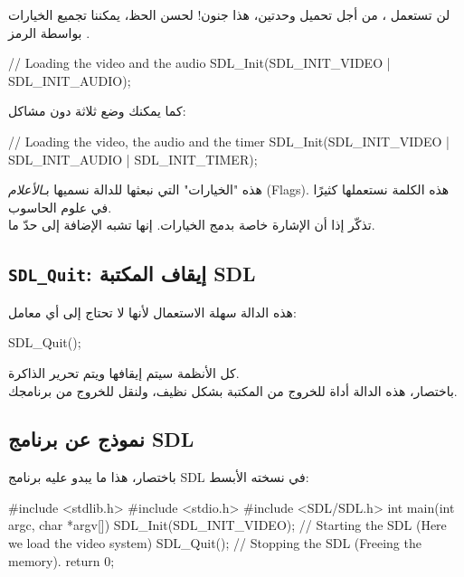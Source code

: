 لن تستعمل
،
من أجل تحميل وحدتين، هذا جنون! لحسن الحظ، يمكننا تجميع الخيارات بواسطة الرمز
\InlineCode{|}.

\begin{Csource}
// Loading the video and the audio
SDL_Init(SDL_INIT_VIDEO | SDL_INIT_AUDIO);
\end{Csource}

كما يمكنك وضع ثلاثة دون مشاكل:

\begin{Csource}
// Loading the video, the audio and the timer
SDL_Init(SDL_INIT_VIDEO | SDL_INIT_AUDIO | SDL_INIT_TIMER);
\end{Csource}

\begin{information}
هذه "الخيارات" التي نبعثها للدالة 
نسميها بـ\textit{الأعلام}
(\textenglish{Flags}).
هذه الكلمة نستعملها كثيرًا في علوم الحاسوب.\\
تذكّر إذا أن الإشارة
\InlineCode{|}
خاصة بدمج الخيارات. إنها تشبه الإضافة إلى حدّ ما.
\end{information}

\subsection{\texttt{SDL\_Quit}: إيقاف المكتبة \textenglish{SDL}}

هذه الدالة سهلة الاستعمال لأنها لا تحتاج إلى أي معامل:

\begin{Csource}
SDL_Quit();
\end{Csource}

كل الأنظمة سيتم إيقافها ويتم تحرير الذاكرة.\\
باختصار، هذه الدالة أداة للخروج من المكتبة بشكل نظيف، ولنقل للخروج من برنامجك.

\subsection{نموذج عن برنامج \textenglish{SDL}}
باختصار، هذا ما يبدو عليه برنامج
\textenglish{SDL}
في نسخته الأبسط:

\begin{Csource}
#include <stdlib.h>
#include <stdio.h>
#include <SDL/SDL.h>
int main(int argc, char *argv[])
{
	SDL_Init(SDL_INIT_VIDEO); // Starting the SDL (Here we load the video system)
	SDL_Quit(); // Stopping the SDL (Freeing the memory).
	return 0;
}
\end{Csource}

